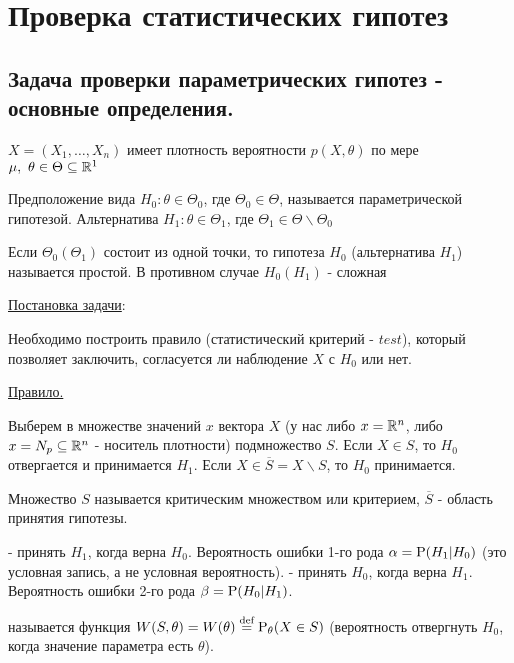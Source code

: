 \section{Проверка статистических гипотез}

\subsection{Задача проверки параметрических гипотез - основные определения.}
\(X = (X_1, \ldots, X_n)\) имеет плотность вероятности \(p(X, \theta)\)
по мере \(\mu,\ \theta\in\Theta\subseteq\R^1\)

\begin{definition}
    Предположение вида \(H_0: \theta\in\Theta_0\), где
    \(\Theta_0\in\Theta\), называется параметрической гипотезой.
    Альтернатива \(H_1:\theta\in\Theta_1\), где
    \(\Theta_1\in\Theta\backslash\Theta_0\)
\end{definition}
\begin{definition}
    Если \(\Theta_0(\Theta_1)\) состоит из одной точки,
    то гипотеза \(H_0\) (альтернатива \(H_1\)) называется
    простой.
    В противном случае \(H_0(H_1)\) - сложная
\end{definition}

\underline{Постановка задачи}:

Необходимо построить правило (статистический критерий - \(test\)),
который позволяет заключить, согласуется ли наблюдение \(X\)
с \(H_0\) или нет.

\underline{Правило.}

Выберем в множестве значений \(x\) вектора \(X\) (у нас либо
\(x = \R^n\), либо \(x = N_p \subseteq \R^n\) - носитель
плотности) подмножество \(S\). Если \(X \in S\), то \(H_0\) отвергается и
принимается \(H_1\). Если \(X \in \overline{S} = X \backslash S\), то
\(H_0\) принимается.

\begin{definition}
    Множество \(S\) называется критическим множеством или критерием,
    \(\overline{S}\) - область принятия гипотезы.
\end{definition}
\begin{definition}
     - принять \(H_1\), когда
    верна \(H_0\). Вероятность ошибки 1-го рода $\alpha
    = \P(H_1 | H_0)$ (это условная запись, а не условная вероятность).
     - принять \(H_0\), когда
    верна \(H_1\). Вероятность ошибки 2-го рода $\beta
    = \P(H_0 | H_1)$.
\end{definition}
\begin{definition}
     называется функция \(W(S, \theta) = W(\theta)
    \defeq\P_\theta(X\in S)\) (вероятность отвергнуть \(H_0\), когда
    значение параметра есть \(\theta\)).
\end{definition}

